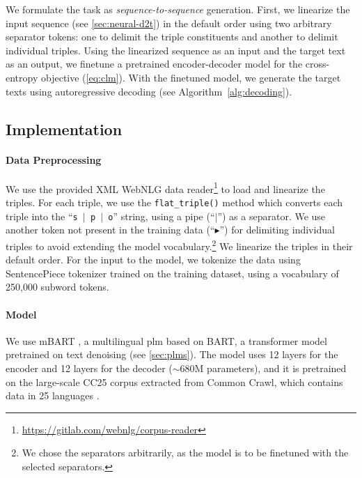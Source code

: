 We formulate the task as \emph{sequence-to-sequence} generation. First, we linearize the input sequence (see \autoref{sec:neural-d2t}) in the default order using two arbitrary separator tokens: one to delimit the triple constituents and another to delimit individual triples. Using the linearized sequence as an input and the target text as an output, we finetune a pretrained encoder-decoder model for the cross-entropy objective (\autoref{eq:clm}). With the finetuned model, we generate the target texts using autoregressive decoding (see Algorithm~\ref{alg:decoding}).

% 


\subsection{Implementation}
\paragraph{Data Preprocessing} We use the provided XML WebNLG data reader\footnote{\url{https://gitlab.com/webnlg/corpus-reader}} to load and linearize the triples. For each triple, we use the \texttt{flat\_triple()} method which converts each triple into the ``\texttt{s $\vert$ p $\vert$ o}'' string, using a pipe (``$\vert$'') as a separator. We use another token not present in the training data (``$\blacktriangleright$'') for delimiting individual triples to avoid extending the model vocabulary.\footnote{We chose the separators arbitrarily, as the model is to be finetuned with the selected separators.} We linearize the triples in their default order. For the input to the model, we tokenize the data using SentencePiece tokenizer \citep{kudo2018sentencepiece} trained on the training dataset, using a vocabulary of 250,000 subword tokens.

\paragraph{Model}
We use mBART \cite{liuMultilingualDenoisingPretraining2020}, a multilingual \ac{plm} based on BART, a transformer model pretrained on text denoising (see \autoref{sec:plms}).
The model uses 12 layers for the encoder and 12 layers for the decoder ($\sim$680M parameters), and it is pretrained on the large-scale CC25 corpus extracted from Common Crawl, which contains data in 25 languages \citep{wenzek2020ccnet}.



